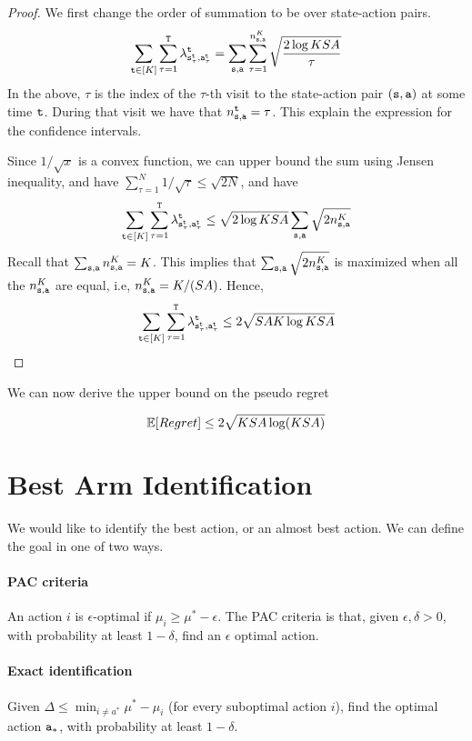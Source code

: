 \begin{proof}
    We first change the order of summation to be over state-action pairs.
    \[
    \sum_{{\tt t}\in [K]} \sum_{\tau=1}^{\tt T}
\lambda^{\tt t}_{{\tt s}_\tau^{\tt t},{\tt a}_\tau^{\tt t}} =
\sum_{{\tt s},{\tt a}} \sum_{\tau=1}^{n_{{\tt s},{\tt a}}^K}
\sqrt{\frac{2\log KSA}{\tau}}
    \]
In the above, $\tau$ is the index of the $\tau$-th visit to the state-action pair $({\tt s},{\tt a})$ at some time ${\tt t}$. During that visit we have that  $n_{{\tt s},{\tt a}}^{\tt t}=\tau$.
This explain the expression for the confidence intervals.

Since $1/\sqrt{x}$ is a convex function, we can upper bound the sum using Jensen inequality, and have $\sum_{\tau=1}^N 1/\sqrt{\tau}\leq \sqrt{2N}$, and have
    \[
    \sum_{{\tt t}\in [K]} \sum_{\tau=1}^{\tt T}
\lambda^{\tt t}_{{\tt s}_\tau^{\tt t},{\tt a}_\tau^{\tt t}} \leq
\sqrt{2\log KSA}
\sum_{{\tt s},{\tt a}}
\sqrt{2 n_{{\tt s},{\tt a}}^K}
    \]
Recall that $\sum_{{\tt s},{\tt a}} n_{{\tt s},{\tt a}}^K =K$. This implies that $\sum_{{\tt s},{\tt a}}
\sqrt{2 n_{{\tt s},{\tt a}}^K}$ is maximized when all the $n_{{\tt s},{\tt a}}^K$ are equal, i.e, $n_{{\tt s},{\tt a}}^K=K/(SA)$. Hence,
    \[
    \sum_{{\tt t}\in [K]} \sum_{\tau=1}^{\tt T}
\lambda^{\tt t}_{{\tt s}_\tau^{\tt t},{\tt a}_\tau^{\tt t}} \leq
2
\sqrt{SAK\log KSA}
    \]
\end{proof}

We can now derive the upper bound on the pseudo regret
\begin{theorem}
    \[
    \mathbb{E}[Regret] \leq 2\sqrt{KSA\log (KSA)}
    \]
\end{theorem}

\section{Best Arm Identification}

We would like to identify the best action, or an almost best action.
We can define the goal in one of two ways.

\paragraph{PAC criteria }
An action $i$ is $\epsilon$-optimal if  $\mu_i\geq \mu^*-\epsilon$. The PAC criteria is
that, given $\epsilon,\delta>0$, with probability at least
$1-\delta$, find an $\epsilon$ optimal action.

\paragraph{Exact identification}
Given $\Delta\le\min_{i\neq a^*}\mu^{*}-\mu_{i}$ (for every suboptimal action $i$),
find the optimal action ${\tt a}_{*}$, with probability at least
$1-\delta$.

